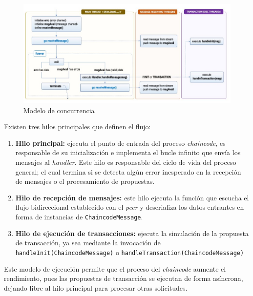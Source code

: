 \begin{figure}[tbph]
\centering
\includegraphics[width=\textwidth]{Images/concurrency_model}
\caption{Modelo de concurrencia}
\label{fig:concurrencyModel}
\end{figure}

Existen tres hilos principales que definen el flujo:

\begin{enumerate}
\item \textbf{Hilo principal:} ejecuta el punto de entrada del proceso \textit{chaincode}, es responsable de su inicialización e implementa el bucle infinito que envía los mensajes al \textit{handler}. Este hilo es responsable del ciclo de vida del proceso general; el cual termina si se detecta algún error inesperado en la recepción de mensajes o el procesamiento de propuestas.

\item \textbf{Hilo de recepción de mensajes:} este hilo ejecuta la función que escucha el flujo bidireccional establecido con el \textit{peer} y deserializa los datos entrantes en forma de instancias de \texttt{ChaincodeMessage}. 


\item \textbf{Hilo de ejecución de transacciones:} ejecuta la simulación de la propuesta de transacción, ya sea mediante la invocación de \texttt{handleInit(ChaincodeMessage)} o \texttt{handleTransaction(ChaincodeMessage)}

\end{enumerate}
Este modelo de ejecución permite que el proceso del \textit{chaincode} aumente el rendimiento, pues las propuestas de transacción se ejecutan de forma asíncrona, dejando libre al hilo principal para procesar otras solicitudes.

